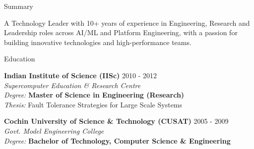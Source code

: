 \documentclass{resume} %
\begin{document}

\begin{rSection}{Summary}

A Technology Leader with 10+ years of experience in Engineering, Research and Leadership roles across AI/ML and Platform Engineering, with a passion for building innovative technologies and high-performance teams. 

\end{rSection}


\begin{rSection}{Education}

{\bf Indian Institute of Science (IISc)} \hfill {2010 - 2012} \\ 
{\em Supercomputer Education \& Research Centre} \smallskip \\
{\em Degree:} {\bf Master of Science in Engineering (Research)} \\
{\em Thesis:} Fault Tolerance Strategies for Large Scale Systems

{\bf Cochin University of Science \& Technology (CUSAT)} \hfill {2005 - 2009} \\
{\em Govt. Model Engineering College} \smallskip \\
{\em Degree:} {\bf Bachelor of Technology, Computer Science \& Engineering}

\end{rSection}

\end{document}
